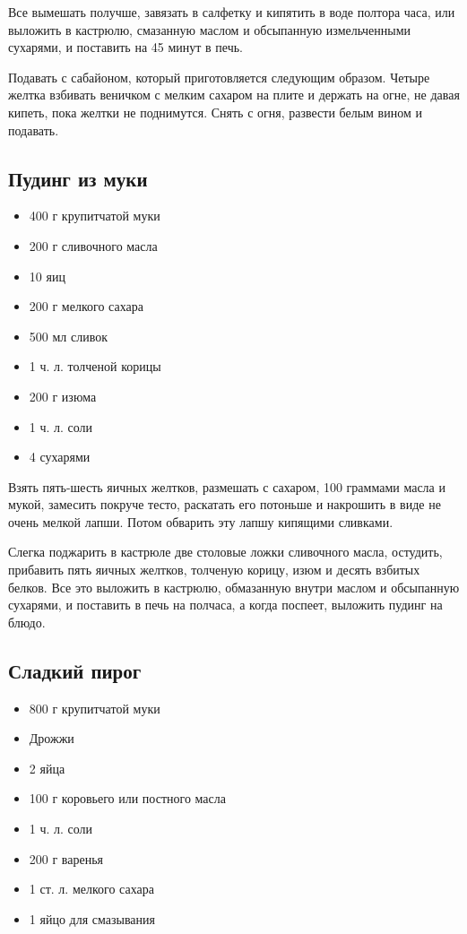 Все вымешать получше, завязать в салфетку и кипятить в воде полтора часа, или выложить в кастрюлю, смазанную маслом и обсыпанную измельченными сухарями, и поставить на 45 минут в печь.

Подавать с сабайоном, который приготовляется следующим образом. Четыре желтка взбивать веничком с мелким сахаром на плите и держать на огне, не давая кипеть, пока желтки не поднимутся. Снять с огня, развести белым вином и подавать.

\subsection{Пудинг из муки}

\begin{itemize}
	\item 400 г крупитчатой муки
    \item 200 г сливочного масла
    \item 10 яиц 
    \item 200 г мелкого сахара
    \item 500 мл сливок
    \item 1 ч. л. толченой корицы
    \item 200 г изюма 
    \item 1 ч. л. соли 
    \item 4 сухарями
\end{itemize}

Взять пять-шесть яичных желтков, размешать с сахаром, 100 граммами масла и мукой, замесить покруче тесто, раскатать его потоньше и накрошить в виде не очень мелкой лапши. Потом обварить эту лапшу кипящими сливками.

Слегка поджарить в кастрюле две столовые ложки сливочного масла, остудить, прибавить пять яичных желтков, толченую корицу, изюм и десять взбитых белков. Все это выложить в кастрюлю, обмазанную внутри маслом и обсыпанную сухарями, и поставить в печь на полчаса, а когда поспеет, выложить пудинг на блюдо.

\subsection{Сладкий пирог}

\begin{itemize}
	\item 800 г крупитчатой муки 
    \item Дрожжи 
    \item 2 яйца
    \item 100 г коровьего или постного масла
    \item 1 ч. л. соли
    \item 200 г варенья 
    \item 1 ст. л. мелкого сахара
    \item 1 яйцо для смазывания
\end{itemize}

